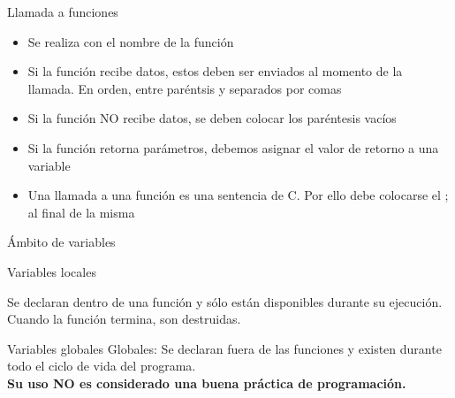\documentclass[xcolor=pdftex,table,11pt]{beamer}
\begin{document}
\begin{frame}[allowframebreaks]{Llamada a funciones}
\begin{itemize}
\item  Se realiza con el nombre de la función
\item  Si la función recibe datos, estos deben ser enviados al momento de la llamada. En orden, entre paréntsis y separados por comas
\item  Si la función NO recibe datos, se deben colocar los paréntesis vacíos
\item  Si la función retorna parámetros, debemos asignar el valor de retorno a una variable
\item  Una llamada a una función es una sentencia de C. Por ello debe colocarse el ; al final de la misma

\end{itemize}



\href{https://github.com/danis963/informaticaI_IUA/blob/main/c/src/7-funcion_sumar.c}{}


\end{frame}

\begin{frame}{Ámbito de variables}
\begin{block}{Variables locales}

Se declaran dentro de una función y sólo están disponibles durante su ejecución. Cuando la función termina, son destruidas.



\end{block}


\begin{block}{Variables globales}
Globales: Se declaran fuera de las funciones y existen durante todo el ciclo de vida del programa.\\

\textbf{Su uso NO es considerado una buena práctica de programación.}



\end{block}
\href{https://github.com/danis963/informaticaI_IUA/blob/main/c/src/7-variables.c}{}


\end{frame}
\end{document}
